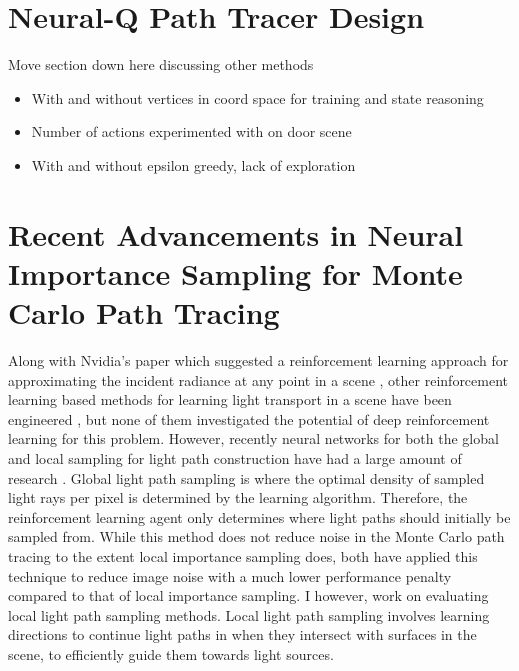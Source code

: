 \documentclass[../dissertation.tex]{subfiles}
\begin{document}
\section{Neural-Q Path Tracer Design}
Move section down here discussing other methods

\begin{itemize}
\item With and without vertices in coord space for training and state reasoning
\item Number of actions experimented with on door scene
\item With and without epsilon greedy, lack of exploration
\end{itemize}

\section{Recent Advancements in Neural Importance Sampling for Monte Carlo Path Tracing}

Along with Nvidia's paper which suggested a reinforcement learning approach for approximating the incident radiance at any point in a scene \cite{dahm2017learning}, other reinforcement learning based methods for learning light transport in a scene have been engineered \cite{muller2017practical, vorba2014line}, but none of them investigated the potential of deep reinforcement learning for this problem. However, recently neural networks for both the global and local sampling for light path construction have had a large amount of research \cite{zheng2018learning, muller2018neural, keller2019integral, hermosilla2018deep}. Global light path sampling is where the optimal density of sampled light rays per pixel is determined by the learning algorithm. Therefore, the reinforcement learning agent only determines where light paths should initially be sampled from. While this method does not reduce noise in the Monte Carlo path tracing to the extent local importance sampling does, both \cite{muller2017practical, zheng2018learning} have applied this technique to reduce image noise with a much lower performance penalty compared to that of local importance sampling. I however, work on evaluating local light path sampling methods. Local light path sampling involves learning directions to continue light paths in when they intersect with surfaces in the scene, to efficiently guide them towards light sources.\\
\end{document}
